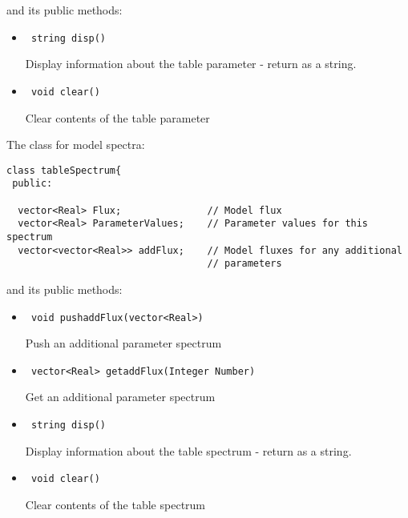 \documentclass[11pt]{book}
\begin{document}
and its public methods:

\begin{itemize}

\item    \begin{verbatim} string disp() \end{verbatim}

           Display information about the table parameter - return as a string.

\item    \begin{verbatim} void clear() \end{verbatim}

           Clear contents of the table parameter

\end{itemize}

The class for model spectra:

\begin{verbatim}
class tableSpectrum{
 public:

  vector<Real> Flux;               // Model flux
  vector<Real> ParameterValues;    // Parameter values for this spectrum
  vector<vector<Real>> addFlux;    // Model fluxes for any additional
                                   // parameters
\end{verbatim}

and its public methods:

\begin{itemize}

\item    \begin{verbatim} void pushaddFlux(vector<Real>) \end{verbatim}
            
            Push an additional parameter spectrum

\item    \begin{verbatim} vector<Real> getaddFlux(Integer Number) \end{verbatim}
            
            Get an additional parameter spectrum

\item    \begin{verbatim} string disp() \end{verbatim}

            Display information about the table spectrum - return as a string.

\item    \begin{verbatim} void clear() \end{verbatim}

            Clear contents of the table spectrum

\end{itemize}
\end{document}
